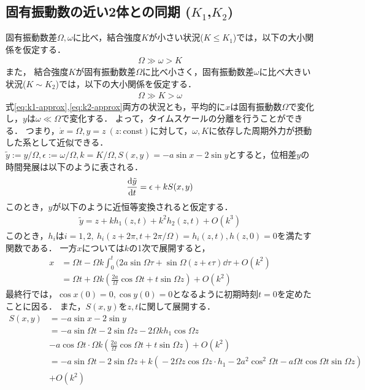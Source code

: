 \documentclass[../main]{subfiles}
\begin{document}
\subsection{固有振動数の近い2体との同期 ($K_1$,$K_2$)}
固有振動数差$\Omega,\omega$に比べ，結合強度$K$が小さい状況($K\leq K_1$)では，以下の大小関係を仮定する．
\begin{align}
    \label{eq:k1-approx}
    \Omega\gg\omega>K
\end{align}
また，
結合強度$K$が固有振動数差$\Omega$に比べ小さく，固有振動数差$\omega$に比べ大きい状況($K\sim K_2$)では，以下の大小関係を仮定する．
\begin{align}
    \label{eq:k2-approx}
    \Omega\gg K>\omega
\end{align}
式\eqref{eq:k1-approx},\eqref{eq:k2-approx}両方の状況とも，平均的に$x$は固有振動数$\Omega$で変化し，$y$は$\omega\ll\Omega$で変化する．
よって，タイムスケールの分離を行うことができる．
つまり，$\dot{x}=\Omega, y=z\ (z:\textrm{const})$に対して，$\omega,K$に依存した周期外力が摂動した系として近似できる．\\
    $\tilde{y}:=y/\Omega,\epsilon:=\omega/\Omega,k=K/\Omega,S(x,y)=-a\sin x-2\sin y$とすると，位相差$y$の時間発展は以下のように表される．
    \begin{align*}
        \dv{\tilde{y}}{t}=\epsilon+k S(x,y) 
    \end{align*}
    このとき，$y$が以下のように近恒等変換されると仮定する．
    \begin{align}
        \tilde{y}=z+kh_1(z,t)+k^2h_2(z,t)+O(k^3)
        \label{eq:pertu-ytilde}
    \end{align}
    このとき，$h_i$は$i=1,2,\ h_i(z+2\pi,t+2\pi/\Omega)=h_i(z,t),h(z,0)=0$を満たす関数である．
    一方$x$については$k$の1次で展開すると，
    \begin{align*}
        x&=\Omega t-\Omega k\int_0^t(2a\sin \Omega\tau+\sin\Omega (z+\epsilon\tau)\dd{\tau}+O(k^2)\\ 
        &=\Omega t+\Omega k\left(\frac{2a}{\Omega}\cos\Omega t+t\sin \Omega z\right)+O(k^2)
    \end{align*}
    最終行では，$\cos x(0)=0,\cos y(0)=0$となるように初期時刻$t=0$を定めたことに因る．
    また，$S(x,y)$を$z,t$に関して展開する．
    \begin{align*}
        S(x,y)&=-a\sin x-2\sin y\\
        &=-a\sin\Omega t-2\sin \Omega z-2\Omega kh_1\cos\Omega z\\
        &-a\cos\Omega t\cdot \Omega k\left(\frac{2a}{\Omega}\cos \Omega t+t\sin \Omega z\right)+O(k^2)\\
        &=-a\sin\Omega t-\!2\sin \Omega z       +k\left(\!-2\Omega z \cos\Omega z\cdot h_1-\!2a^2\cos^2\Omega t-\!a\Omega t\cos \Omega  t\sin \Omega z\right)\\
        &+O(k^2)
    \end{align*}
\end{document}
